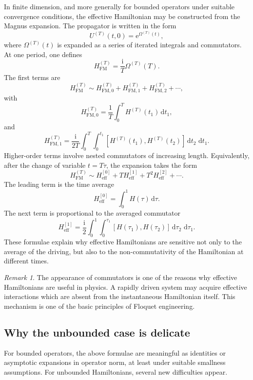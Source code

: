 \documentclass[11pt]{amsart}
\theoremstyle{plain}
\theoremstyle{definition}
\theoremstyle{remark}
\newtheorem{remark}[theorem]{Remark}
\newcommand{\ii}{\mathrm i}
\newcommand{\ee}{\mathrm e}
\newcommand{\dd}{\,\mathrm d}
\begin{document}
In finite dimension, and more generally for bounded operators under
suitable convergence conditions, the effective Hamiltonian may be
constructed from the Magnus expansion.  The propagator is written in the
form
\[
        U^{(T)}(t,0)=\ee^{\Omega^{(T)}(t)},
\]
where \(\Omega^{(T)}(t)\) is expanded as a series of iterated integrals
and commutators.  At one period, one defines
\[
        H_{\mathrm{FM}}^{(T)}
        =
        \frac{\ii}{T}\Omega^{(T)}(T).
\]
The first terms are
\[
        H_{\mathrm{FM}}^{(T)}
        \sim
        H_{\mathrm{FM},0}^{(T)}
        +
        H_{\mathrm{FM},1}^{(T)}
        +
        H_{\mathrm{FM},2}^{(T)}
        +\cdots ,
\]
with
\[
        H_{\mathrm{FM},0}^{(T)}
        =
        \frac1T\int_0^T H^{(T)}(t_1)\dd t_1,
\]
and
\[
        H_{\mathrm{FM},1}^{(T)}
        =
        \frac{\ii}{2T}
        \int_0^T
        \int_0^{t_1}
        [H^{(T)}(t_1),H^{(T)}(t_2)]
        \dd t_2\,\dd t_1.
\]
Higher-order terms involve nested commutators of increasing length.
Equivalently, after the change of variable \(t=T\tau\), the expansion
takes the form
\[
        H_{\mathrm{FM}}^{(T)}
        \sim
        H_{\mathrm{eff}}^{[0]}
        +
        T H_{\mathrm{eff}}^{[1]}
        +
        T^2 H_{\mathrm{eff}}^{[2]}
        +\cdots .
\]
The leading term is the time average
\[
        H_{\mathrm{eff}}^{[0]}
        =
        \int_0^1 H(\tau)\dd\tau.
\]
The next term is proportional to the averaged commutator
\[
        H_{\mathrm{eff}}^{[1]}
        =
        \frac{\ii}{2}
        \int_0^1
        \int_0^{\tau_1}
        [H(\tau_1),H(\tau_2)]
        \dd\tau_2\,\dd\tau_1.
\]
These formulae explain why effective Hamiltonians are sensitive not
only to the average of the driving, but also to the non-commutativity of
the Hamiltonian at different times.

\begin{remark}
The appearance of commutators is one of the reasons why effective
Hamiltonians are useful in physics.  A rapidly driven system may acquire
effective interactions which are absent from the instantaneous
Hamiltonian itself.  This mechanism is one of the basic principles of
Floquet engineering.
\end{remark}

\subsection{Why the unbounded case is delicate}

For bounded operators, the above formulae are meaningful as identities
or asymptotic expansions in operator norm, at least under suitable
smallness assumptions.  For unbounded Hamiltonians, several new
difficulties appear.
\end{document}
